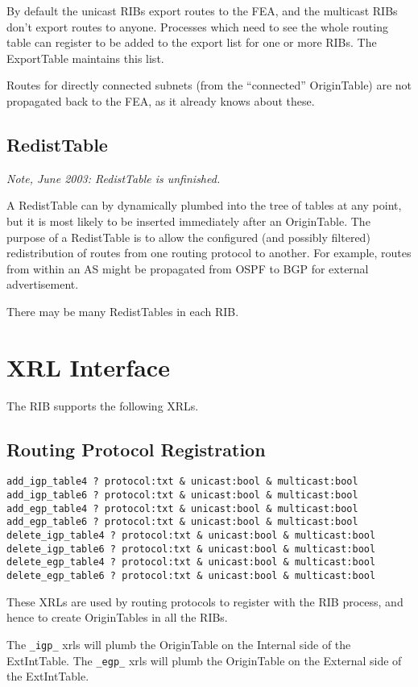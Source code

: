 \documentclass[11pt]{article}
\begin{document}
By default the unicast RIBs export routes to the FEA, and the
multicast RIBs don't export routes to anyone.  Processes which need to
see the whole routing table can register to be added to the export
list for one or more RIBs. The ExportTable maintains this list.

Routes for directly connected subnets (from the ``connected''
OriginTable) are not propagated back to the FEA, as it already knows
about these.

\subsection{RedistTable}

{\it Note, June 2003: RedistTable is unfinished.}

A RedistTable can by dynamically plumbed into the tree of tables at
any point, but it is most likely to be inserted immediately after an
OriginTable.  The purpose of a RedistTable is to allow the configured
(and possibly filtered) redistribution of routes from one routing
protocol to another.  For example, routes from within an AS might be
propagated from OSPF to BGP for external advertisement.

There may be many RedistTables in each RIB.

\section{XRL Interface}

The RIB supports the following XRLs.
\subsection{Routing Protocol Registration}
\begin{verbatim}
add_igp_table4 ? protocol:txt & unicast:bool & multicast:bool
add_igp_table6 ? protocol:txt & unicast:bool & multicast:bool
add_egp_table4 ? protocol:txt & unicast:bool & multicast:bool
add_egp_table6 ? protocol:txt & unicast:bool & multicast:bool
delete_igp_table4 ? protocol:txt & unicast:bool & multicast:bool
delete_igp_table6 ? protocol:txt & unicast:bool & multicast:bool
delete_egp_table4 ? protocol:txt & unicast:bool & multicast:bool
delete_egp_table6 ? protocol:txt & unicast:bool & multicast:bool
\end{verbatim}
These XRLs are used by routing protocols to register with the RIB
process, and hence to create OriginTables in all the RIBs.

The {\tt \_igp\_} xrls will plumb the OriginTable on the Internal side
of the ExtIntTable.  The {\tt \_egp\_} xrls will plumb the OriginTable
on the External side of the ExtIntTable.
\end{document}
